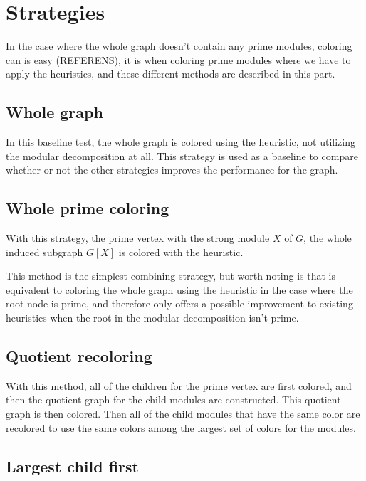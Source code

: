 \documentclass{amsart}
\begin{document}
\section{Strategies}
\label{sec:Strategies}
In the case where the whole graph doesn't contain any prime modules, coloring
can is easy (REFERENS), it is when coloring prime modules where we have to apply
the heuristics, and these different methods are described in this part.

\subsection{Whole graph}

In this baseline test, the whole graph is colored using the heuristic, not
utilizing the modular decomposition at all. This strategy is used as a baseline
to compare whether or not the other strategies improves the performance for the
graph.

\subsection{Whole prime coloring}

With this strategy, the prime vertex with the strong module $X$ of $G$, the
whole induced subgraph $G[X]$ is colored with the heuristic.

This method is the simplest combining strategy, but worth noting is that is
equivalent to coloring the whole graph using the heuristic in the case where the
root node is prime, and therefore only offers a possible improvement to existing
heuristics when the root in the modular decomposition isn't prime.

\subsection{Quotient recoloring}

With this method, all of the children for the prime vertex are first colored,
and then the quotient graph for the child modules are constructed. This quotient
graph is then colored. Then all of the child modules that have the same color
are recolored to use the same colors among the largest set of colors for the
modules.



\subsection{Largest child first}
\end{document}
